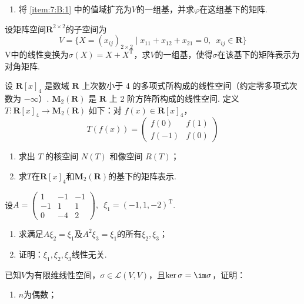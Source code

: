 \begin{exercise}
\begin{exgroup}[2]
\begin{enumerate}
            \item 将 \ref*{item:7:B:1} 中的值域扩充为$V$的一组基，并求$\varphi$在这组基下的矩阵.
        \end{enumerate}

        \item 设矩阵空间$\mathbf{R}^{2\times 2}$的子空间为
        \[V=\{X=(x_{ij})_{2\times 2} \mid x_{11}+x_{12}+x_{21}=0,\enspace x_{ij}\in \mathbf{R}\}\]
        V中的线性变换为$\sigma(X)=X+X^\mathrm{T}$，求$V$的一组基，使得$\sigma$在该基下的矩阵表示为对角矩阵.

        \item 设 $\mathbf{R}[x]_4$ 是数域 $\mathbf{R}$ 上次数小于 4 的多项式所构成的线性空间（约定零多项式次数为 $-\infty$）. $\mathbf{M}_2(\mathbf{R})$ 是 $\mathbf{R}$ 上 2 阶方阵所构成的线性空间. 定义 $T : \mathbf{R}[x]_4 \to \mathbf{M}_2(\mathbf{R})$ 如下：对 $f(x) \in \mathbf{R}[x]_4$，
        \[T(f(x))=\begin{pmatrix}f(0) & f(1) \\ f(-1) & f(0)\end{pmatrix}\]
        \begin{enumerate}
            \item 求出 $T$ 的核空间 $N(T)$ 和像空间 $R(T)$；

            \item 求$T$在$\mathbf{R}[x]_4$和$\mathbf{M}_2(\mathbf{R})$的基下的矩阵表示.
        \end{enumerate}

        \item 设$A=\begin{pmatrix}
                1 & -1 & -1 \\ -1 & 1 & 1 \\ 0 & -4 & 2
            \end{pmatrix},\enspace\xi_1=(-1,1,-2)^\mathrm{T}$.
        \begin{enumerate}
            \item 求满足$A\xi_2=\xi_1$及$A^2\xi_3=\xi_1$的所有$\xi_2,\xi_3$；

            \item 证明：$\xi_1,\xi_2,\xi_3$线性无关.
        \end{enumerate}

        \item 已知$V$为有限维线性空间，$\sigma\in \mathcal{L}(V,V)$，且$\ker\sigma=\im \sigma$，证明：
        \begin{enumerate}
            \item $n$为偶数；


\end{enumerate}
\end{exgroup}
\end{exercise}

